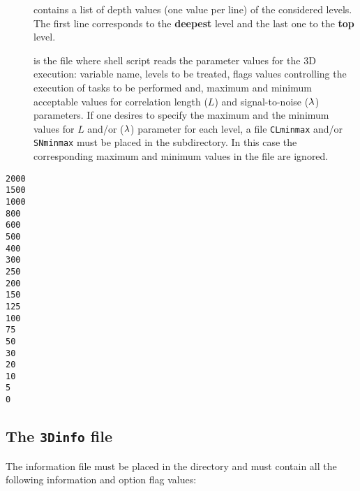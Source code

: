 \begin{description}

\item[] contains a list of depth values (one value per line) of the considered levels. The first line corresponds to the \textbf{deepest} level and the last one to the \textbf{top} level. 

\item[] is the file where shell script reads the parameter values for the 3D execution: variable name, levels to be treated, flags values controlling the execution of tasks to be performed and, maximum and minimum acceptable values for correlation length ($L$) and signal-to-noise ($\lambda$) parameters. If one desires to specify the maximum and the minimum values for $L$  and/or ($\lambda$) parameter for each level, a file \texttt{CLminmax} and/or \texttt{SNminmax} must be placed in the  subdirectory. In this case the corresponding maximum and minimum values in the  file are ignored.
\end{description}

\begin{center}
\begin{exfile}[H] %
\begin{footnotesize}
\begin{verbatim}
2000
1500
1000
800
600
500
400
300
250
200
150
125
100
75
50
30
20
10
5
0
\end{verbatim}
\end{footnotesize}
\caption{}
\label{contdepthfile}
\end{exfile}

\end{center}




\subsection{The \texttt{3Dinfo} file \label{sec:3Dinfo}}

The information file  must be placed in the  directory and must contain all the following information and option flag values:


